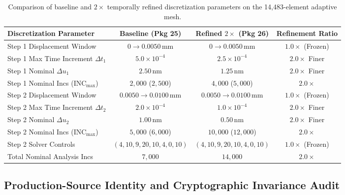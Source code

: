 \begin{table}[htbp]
\centering
\caption{Comparison of baseline and $2\times$ temporally refined discretization parameters on the 14,483-element adaptive mesh.}
\label{tab:stage14ur_temporal_parameters}
\begin{tabular}{lccc}
\hline
\textbf{Discretization Parameter} & \textbf{Baseline (Pkg 25)} & \textbf{Refined $2\times$ (Pkg 26)} & \textbf{Refinement Ratio} \\
\hline
Step 1 Displacement Window & $0 \to 0.0050\,\mathrm{mm}$ & $0 \to 0.0050\,\mathrm{mm}$ & $1.0\times$ (Frozen) \\
Step 1 Max Time Increment $\Delta t_1$ & $5.0 \times 10^{-4}$ & $2.5 \times 10^{-4}$ & $2.0\times$ Finer \\
Step 1 Nominal $\Delta u_1$ & $2.50\,\mathrm{nm}$ & $1.25\,\mathrm{nm}$ & $2.0\times$ Finer \\
Step 1 Nominal Incs ($\mathrm{INC}_{\max}$) & $2{,}000$ ($2{,}500$) & $4{,}000$ ($5{,}000$) & $2.0\times$ \\
Step 2 Displacement Window & $0.0050 \to 0.0100\,\mathrm{mm}$ & $0.0050 \to 0.0100\,\mathrm{mm}$ & $1.0\times$ (Frozen) \\
Step 2 Max Time Increment $\Delta t_2$ & $2.0 \times 10^{-4}$ & $1.0 \times 10^{-4}$ & $2.0\times$ Finer \\
Step 2 Nominal $\Delta u_2$ & $1.00\,\mathrm{nm}$ & $0.50\,\mathrm{nm}$ & $2.0\times$ Finer \\
Step 2 Nominal Incs ($\mathrm{INC}_{\max}$) & $5{,}000$ ($6{,}000$) & $10{,}000$ ($12{,}000$) & $2.0\times$ \\
Step 2 Solver Controls & $(4, 10, 9, 20, 10, 4, 0, 10)$ & $(4, 10, 9, 20, 10, 4, 0, 10)$ & $1.0\times$ (Frozen) \\
Total Nominal Analysis Incs & $7{,}000$ & $14{,}000$ & $2.0\times$ \\
\hline
\end{tabular}
\end{table}

\subsection{Production-Source Identity and Cryptographic Invariance Audit}
\label{subsec:stage14ur_source_audit}

